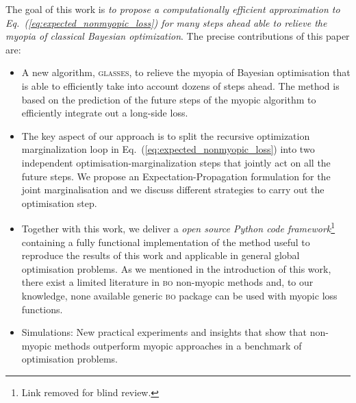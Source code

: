 \documentclass[twoside]{article}
\newcommand{\acr}[1]{\textsc{#1}\xspace}
\newcommand{\us}{\acr{glasses}}
\newcommand{\bo}{\acr{bo}}
\begin{document}
The goal of this work is \emph{to propose a computationally efficient approximation to Eq.~(\ref{eq:expected_nonmyopic_loss}) for many steps ahead able to relieve the myopia of classical Bayesian optimization}. The precise contributions of this paper are:
\begin{itemize}
\item A new algorithm, \us, to relieve the myopia of Bayesian optimisation that is able to efficiently take into account dozens of steps ahead. The method is based on the prediction of the future steps of the myopic algorithm to efficiently integrate out a long-side loss. 
\item The key aspect of our approach is to split the recursive optimization marginalization loop in Eq.~(\ref{eq:expected_nonmyopic_loss}) into two independent optimisation-marginalization steps that jointly act on all the future steps. We propose an Expectation-Propagation formulation for the joint marginalisation and we discuss different strategies to carry out the optimisation step.
\item Together with this work, we deliver a \emph{open source Python code framework}\footnote{Link removed for blind review.} containing a fully functional  implementation of the method useful to reproduce the results of this work and applicable in general global optimisation problems. As we mentioned in the introduction of this work, there exist a limited literature in \bo non-myopic methods and, to our knowledge, none available generic \bo package can be used with myopic loss functions. 
\item Simulations: New practical experiments and insights that show that non-myopic methods outperform myopic approaches in a benchmark of optimisation problems. 
\end{itemize}
\end{document}
